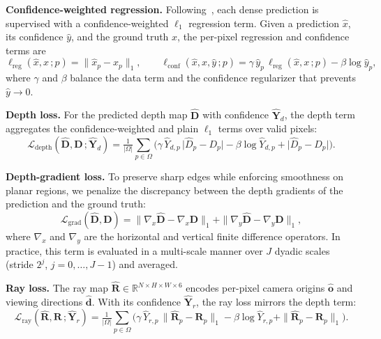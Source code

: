 \noindent\textbf{Confidence-weighted regression.}
Following~\citet{wang2024dust3r,leroy2024mast3r}, each dense prediction is supervised with a confidence-weighted $\ell_1$ regression term. 
%
Given a prediction $\hat{x}$, its confidence $\hat{y}$, and the ground truth $x$, the per-pixel regression and confidence terms are
\begin{equation}
\ell_{\text{reg}}(\hat{x},x\,;p) = \| \hat{x}_p-x_p \|_1,\qquad
\ell_{\text{conf}}(\hat{x},x,\hat{y}\,;p) = \gamma\,\hat{y}_p\,\ell_{\text{reg}}(\hat{x},x\,;p) - \beta\log \hat{y}_p,
\label{eq:conf_reg}
\end{equation}
where $\gamma$ and $\beta$ balance the data term and the confidence regularizer that prevents $\hat{y}\!\to\!0$.

\noindent\textbf{Depth loss.}
For the predicted depth map $\hat{\mathbf{D}}$ with confidence $\hat{\mathbf{Y}}_d$, the depth term aggregates the confidence-weighted and plain $\ell_1$ terms over valid pixels:
\begin{equation}
\mathcal{L}_{\text{depth}}(\hat{\mathbf{D}},\mathbf{D}\,;\hat{\mathbf{Y}}_d)
= \tfrac{1}{|\Omega|}\sum_{p\in\Omega}\!\Big(
\gamma\,\hat{Y}_{d,p}\,\big|\hat{D}_p - D_p\big| - \beta\log \hat{Y}_{d,p} + \big|\hat{D}_p - D_p\big|
\Big).
\end{equation}

\noindent\textbf{Depth-gradient loss.}
To preserve sharp edges while enforcing smoothness on planar regions, we penalize the discrepancy between the depth gradients of the prediction and the ground truth:
\begin{equation}
\mathcal{L}_{\text{grad}}(\hat{\mathbf{D}},\mathbf{D}) = \|\nabla_x \hat{\mathbf{D}} - \nabla_x \mathbf{D}\|_1 + \|\nabla_y \hat{\mathbf{D}} - \nabla_y \mathbf{D}\|_1,
\end{equation}
where $\nabla_x$ and $\nabla_y$ are the horizontal and vertical finite difference operators. In practice, this term is evaluated in a multi-scale manner over $J$ dyadic scales (stride $2^{j}$, $j=0,\dots,J\!-\!1$) and averaged.

\noindent\textbf{Ray loss.}
The ray map $\hat{\mathbf{R}}\in\mathbb{R}^{N\times H\times W\times 6}$ encodes per-pixel camera origins $\hat{\mathbf{o}}$ and viewing directions $\hat{\mathbf{d}}$. With its confidence $\hat{\mathbf{Y}}_r$, the ray loss mirrors the depth term:
\begin{equation}
\mathcal{L}_{\text{ray}}(\hat{\mathbf{R}},\mathbf{R}\,;\hat{\mathbf{Y}}_r)
= \tfrac{1}{|\Omega|}\sum_{p\in\Omega}\!\Big(
\gamma\,\hat{Y}_{r,p}\,\|\hat{\mathbf{R}}_p - \mathbf{R}_p\|_1 - \beta\log \hat{Y}_{r,p} + \|\hat{\mathbf{R}}_p - \mathbf{R}_p\|_1
\Big).
\end{equation}


